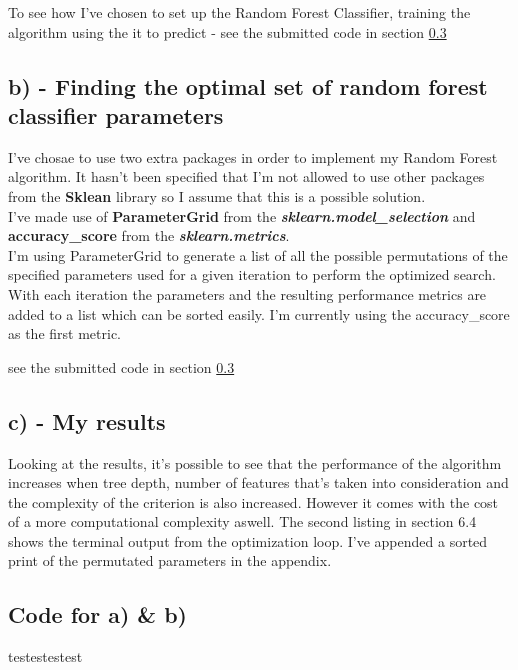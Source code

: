 To see how I've chosen to set up the Random Forest Classifier, training the algorithm using the
it to predict - see the submitted code in section \ref{Code_setup}


\subsection{b) - Finding the optimal set of random forest classifier parameters}
I've chosae to use two extra packages in order to implement my Random Forest algorithm.
It hasn't been specified that I'm not allowed to use other packages from the \textbf{Sklean} library
so I assume that this is a possible solution.
\\
I've made use of \textbf{ParameterGrid} from the \textbf{\textit{sklearn.model\_selection}}
and \textbf{accuracy\_score} from the \textbf{\textit{sklearn.metrics}}.
\\
I'm using ParameterGrid to generate a list of all the possible permutations of the specified parameters used
for a given iteration to perform the optimized search.
With each iteration the parameters and the resulting performance metrics are added to a list which can be
sorted easily. I'm currently using the accuracy\_score as the first metric.

see the submitted code in section \ref{Code_setup}






\subsection{c) - My results}
Looking at the results, it's possible to see that the performance of the algorithm increases
when tree depth, number of features that's taken into consideration and the complexity of the criterion
is also increased.
However it comes with the cost of a more computational complexity aswell. The second listing in section 6.4 
shows the terminal output from the optimization loop.
I've appended a sorted print of the permutated parameters in the appendix. 






\subsection{Code for a) \& b)}
\label{Code_setup}
testestestest

